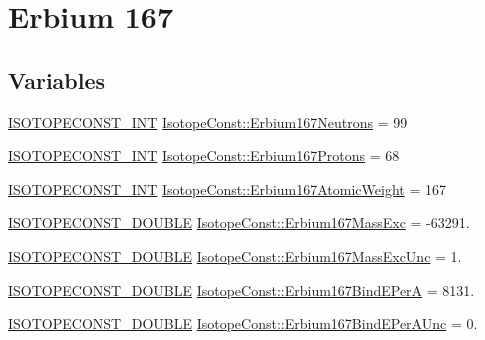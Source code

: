 \hypertarget{group___isotope_const-_erbium-_er167}{}\section{Erbium 167}
\label{group___isotope_const-_erbium-_er167}
\subsection*{Variables}
\begin{DoxyCompactItemize}
\item 
\mbox{\hyperlink{group___isotope_const-_macros_ga5f18360b3e99483a35c32d789e62621c}{I\+S\+O\+T\+O\+P\+E\+C\+O\+N\+S\+T\+\_\+\+I\+NT}} \mbox{\hyperlink{group___isotope_const-_erbium-_er167_ga7f69b0fb4a9c2b5981690983fe2240ef}{Isotope\+Const\+::\+Erbium167\+Neutrons}} = 99
\item 
\mbox{\hyperlink{group___isotope_const-_macros_ga5f18360b3e99483a35c32d789e62621c}{I\+S\+O\+T\+O\+P\+E\+C\+O\+N\+S\+T\+\_\+\+I\+NT}} \mbox{\hyperlink{group___isotope_const-_erbium-_er167_ga63fa26767f63801a2aa0cfa4e9d2ec1e}{Isotope\+Const\+::\+Erbium167\+Protons}} = 68
\item 
\mbox{\hyperlink{group___isotope_const-_macros_ga5f18360b3e99483a35c32d789e62621c}{I\+S\+O\+T\+O\+P\+E\+C\+O\+N\+S\+T\+\_\+\+I\+NT}} \mbox{\hyperlink{group___isotope_const-_erbium-_er167_gaa03379f8e7961b13b7392faf9c8b17b3}{Isotope\+Const\+::\+Erbium167\+Atomic\+Weight}} = 167
\item 
\mbox{\hyperlink{group___isotope_const-_macros_ga8f45a7272ce02c0b4c65c44636ed719a}{I\+S\+O\+T\+O\+P\+E\+C\+O\+N\+S\+T\+\_\+\+D\+O\+U\+B\+LE}} \mbox{\hyperlink{group___isotope_const-_erbium-_er167_ga5737393d066883bccd3d942c6fd74079}{Isotope\+Const\+::\+Erbium167\+Mass\+Exc}} = -\/63291.
\item 
\mbox{\hyperlink{group___isotope_const-_macros_ga8f45a7272ce02c0b4c65c44636ed719a}{I\+S\+O\+T\+O\+P\+E\+C\+O\+N\+S\+T\+\_\+\+D\+O\+U\+B\+LE}} \mbox{\hyperlink{group___isotope_const-_erbium-_er167_ga82d97e20d7bcdc7f63c4ae5cf6fef3f4}{Isotope\+Const\+::\+Erbium167\+Mass\+Exc\+Unc}} = 1.
\item 
\mbox{\hyperlink{group___isotope_const-_macros_ga8f45a7272ce02c0b4c65c44636ed719a}{I\+S\+O\+T\+O\+P\+E\+C\+O\+N\+S\+T\+\_\+\+D\+O\+U\+B\+LE}} \mbox{\hyperlink{group___isotope_const-_erbium-_er167_gafa31f763a2f0e800610a19330ad9ffd0}{Isotope\+Const\+::\+Erbium167\+Bind\+E\+PerA}} = 8131.
\item 
\mbox{\hyperlink{group___isotope_const-_macros_ga8f45a7272ce02c0b4c65c44636ed719a}{I\+S\+O\+T\+O\+P\+E\+C\+O\+N\+S\+T\+\_\+\+D\+O\+U\+B\+LE}} \mbox{\hyperlink{group___isotope_const-_erbium-_er167_ga1f2d9c171815b49b4cf767d94a1a5c2b}{Isotope\+Const\+::\+Erbium167\+Bind\+E\+Per\+A\+Unc}} = 0.

\end{DoxyCompactItemize}
